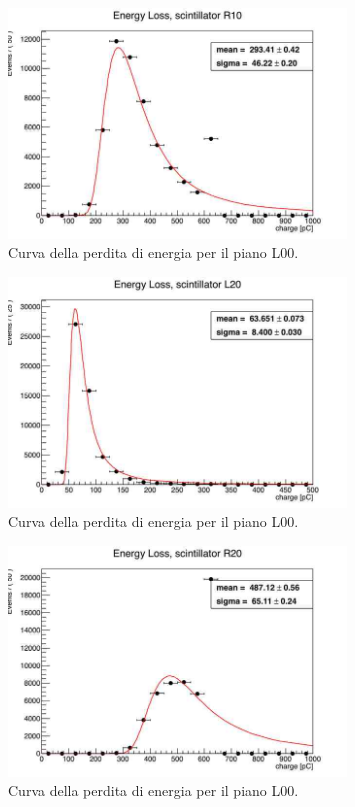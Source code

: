 \begin{figure}[H]
  \centering
  \includegraphics[width=0.8\textwidth]{plots/energy_R10.jpg}
  \caption{Curva della perdita di energia per il piano L00.}
  \label{fig:r10}
\end{figure}

\begin{figure}[H]
  \centering
  \includegraphics[width=0.8\textwidth]{plots/energy_L20.jpg}
  \caption{Curva della perdita di energia per il piano L00.}
  \label{fig:l20}
\end{figure}

\begin{figure}[H]
  \centering
  \includegraphics[width=0.8\textwidth]{plots/energy_R20.jpg}
  \caption{Curva della perdita di energia per il piano L00.}
  \label{fig:r20}
\end{figure}


